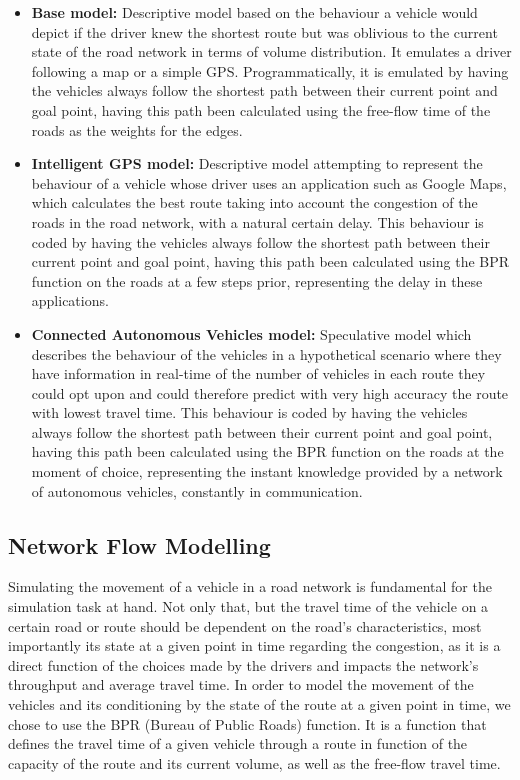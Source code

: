\begin{itemize}
    \item \textbf{Base model:} Descriptive model based on the behaviour a vehicle would depict if the driver knew the shortest route but was oblivious to the current state of the road network in terms of volume distribution. It emulates a driver following a map or a simple GPS. Programmatically, it is emulated by having the vehicles always follow the shortest path between their current point and goal point, having this path been calculated using the free-flow time of the roads as the weights for the edges.
    \item \textbf{Intelligent GPS model:} Descriptive model attempting to represent the behaviour of a vehicle whose driver uses an application such as Google Maps, which calculates the best route taking into account the congestion of the roads in the road network, with a natural certain delay. This behaviour is coded by having the vehicles always follow the shortest path between their current point and goal point, having this path been calculated using the BPR function on the roads at a few steps prior, representing the delay in these applications.
    \item \textbf{Connected Autonomous Vehicles model:} Speculative model which describes the behaviour of the vehicles in a hypothetical scenario where they have information in real-time of the number of vehicles in each route they could opt upon and could therefore predict with very high accuracy the route with lowest travel time. This behaviour is coded by having the vehicles always follow the shortest path between their current point and goal point, having this path been calculated using the BPR function on the roads at the moment of choice, representing the instant knowledge provided by a network of autonomous vehicles, constantly in communication.
\end{itemize}

\subsection{Network Flow Modelling}

Simulating the movement of a vehicle in a road network is fundamental for the simulation task at hand. Not only that, but the travel time of the vehicle on a certain road or route should be dependent on the road's characteristics, most importantly its state at a given point in time regarding the congestion, as it is a direct function of the choices made by the drivers and impacts the network's throughput and average travel time. In order to model the movement of the vehicles and its conditioning by the state of the route at a given point in time, we chose to use the BPR (Bureau of Public Roads) function. It is a function that defines the travel time of a given vehicle through a route in function of the capacity of the route and its current volume, as well as the free-flow travel time. 

